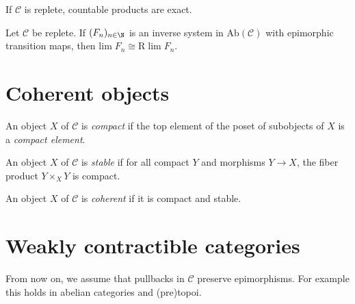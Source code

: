 \begin{proposition}
    If $\mathcal{C}$ is replete, countable products are exact.
    \label{prop:replete-products-exact}
\end{proposition}

\begin{proposition}
    Let $\mathcal{C}$ be replete.
    If $(F_n)_{n \in \N}$ is an inverse system in $\mathrm{Ab}(\mathcal{C})$ with
    epimorphic transition maps, then $\mathrm{lim} \; F_n \cong \mathrm{R}\; \mathrm{lim} \; F_n$.
    \label{prop:lim-exact-replete}
\end{proposition}

\section{Coherent objects}

\begin{definition}
    An object $X$ of $\mathcal{C}$ is \emph{compact} if the top element of the poset
    of subobjects of $X$ is a \emph{compact element}.
    \label{def:compact-object}
\end{definition}

\begin{definition}
    An object $X$ of $\mathcal{C}$ is \emph{stable} if for all compact $Y$ and morphisms $Y \to X$,
    the fiber product $Y \times_{X} Y$ is compact.
    \label{def:stable-object}
\end{definition}

\begin{definition}
    An object $X$ of $\mathcal{C}$ is \emph{coherent} if it is compact and stable.
    \label{def:coherent-object}
\end{definition}

\section{Weakly contractible categories}

From now on, we assume that pullbacks in $\mathcal{C}$ preserve epimorphisms. For example
this holds in abelian categories and (pre)topoi.

